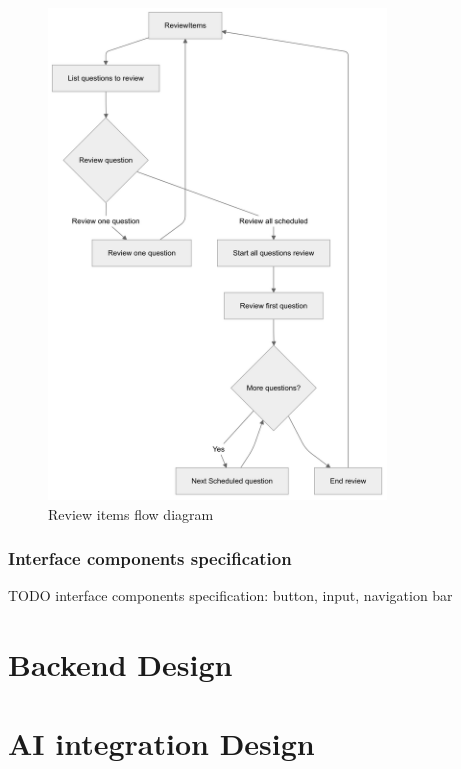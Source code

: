 \begin{figure}[H]
    \centering
    \includegraphics[width=0.8\textwidth, keepaspectratio]{figures/flow-review-item.png}
    \caption{Review items flow diagram}
    \label{fig:flow-review-item}
\end{figure}

\subsubsection{Interface components specification}

TODO interface components specification: button, input, navigation bar

\section{Backend Design}

\section{AI integration Design}